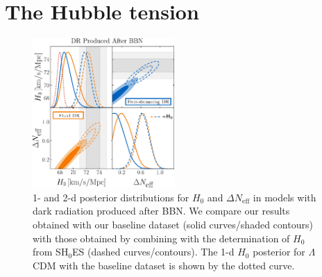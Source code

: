 \documentclass[aps,prd,twocolumn,notitlepage,
superscriptaddress,
nofootinbib,floatfix]{revtex4-2}
\newcommand{\DNeff}{\Delta N_\text{eff}}
\begin{document}
\section{The Hubble tension}\label{sec:Hubble tension}

\begin{figure}
    \includegraphics[width=0.48\textwidth]{figures_21_4/main_H0tension_2.pdf}
    \caption{1- and 2-d posterior distributions for $H_0$ and $\DNeff$ in models with dark radiation produced after BBN. We compare our results obtained with our baseline dataset  (solid curves/shaded contours) with those obtained by combining with the determination of $H_0$ from SH$_0$ES (dashed curves/contours). The 1-d $H_0$ posterior for $\Lambda$CDM with the baseline dataset is shown by the dotted curve.}
    \label{fig:SHOES}
\end{figure}
\end{document}
